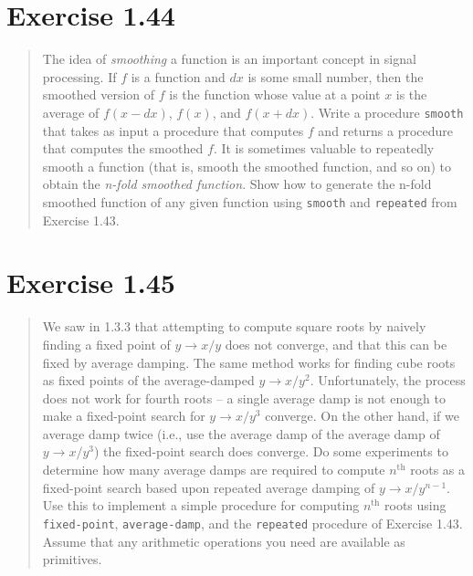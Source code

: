 \documentclass{article}
\begin{document}


\section{Exercise 1.44}
\begin{quote}
    The idea of \emph{smoothing} a function is an important concept in signal
    processing. If $f$ is a function and $dx$ is some small number, then the
    smoothed version of $f$ is the function whose value at a point $x$ is the
    average of $f(x-dx)$, $f(x)$, and $f(x+dx)$. Write a procedure
    \texttt{smooth} that takes as input a procedure that computes $f$ and
    returns a procedure that computes the smoothed $f$. It is sometimes valuable
    to repeatedly smooth a function (that is, smooth the smoothed function, and
    so on) to obtain the \emph{n-fold smoothed function}. Show how to generate
    the n-fold smoothed function of any given function using \texttt{smooth} and
    \texttt{repeated} from Exercise 1.43.
\end{quote}



\section{Exercise 1.45}
\begin{quote}
    We saw in 1.3.3 that attempting to compute square roots by naively finding
    a fixed point of $y\rightarrow x/y$ does not converge, and that this can be
    fixed by average damping. The same method works for finding cube roots as
    fixed points of the average-damped $y\rightarrow x/y^2$. Unfortunately, the
    process does not work for fourth roots -- a single average damp is not
    enough to make a fixed-point search for $y\rightarrow x/y^3$ converge. On
    the other hand, if we average damp twice (i.e., use the average damp of the
    average damp of $y\rightarrow x/y^3$) the fixed-point search does converge.
    Do some experiments to determine how many average damps are required to
    compute $n^{\textrm{th}}$ roots as a fixed-point search based upon repeated
    average damping of $y\rightarrow x/y^{n-1}$.  Use this to implement a
    simple procedure for computing $n^{\textrm{th}}$ roots using
    \texttt{fixed-point}, \texttt{average-damp}, and the \texttt{repeated}
    procedure of Exercise 1.43.  Assume that any arithmetic operations you need
    are available as primitives.
\end{quote}


\end{document}
